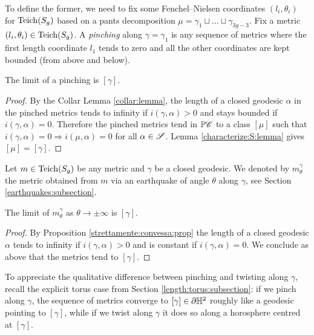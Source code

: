 To define the former, we need to fix some Fenchel--Nielsen coordinates $(l_i, \theta_i)$ for ${\rm Teich}(S_g)$ based on a pants decomposition $\mu = \gamma_1\sqcup \ldots \sqcup \gamma_{3g-3}$.
Fix a metric $(l_i,\theta_i) \in {\rm Teich}(S_g)$. A \emph{pinching} along $\gamma=\gamma_1$ is any sequence of metrics where the first length coordinate $l_1$ tends to zero and all the other coordinates are kept bounded (from above and below).

\begin{prop}
The limit of a pinching is $[\gamma]$.
\end{prop}
\begin{proof}
By the Collar Lemma \ref{collar:lemma}, the length of a closed geodesic $\alpha$ in the pinched metrics tends to infinity if $i(\gamma,\alpha)>0$ and stays bounded if $i(\gamma,\alpha)=0$. Therefore the pinched metrics tend in $\mathbb{P}\mathscr{C}$ to a class $[\mu]$ such that $i(\gamma,\alpha) = 0 \Rightarrow i(\mu,\alpha)=0$ for all $\alpha \in \mathscr{S}$. Lemma 
\ref{characterize:S:lemma} gives $[\mu] = [\gamma]$.
\end{proof}

Let $m\in {\rm Teich}(S_g)$ be any metric and $\gamma$ be a closed geodesic.  We denoted by $m_\theta^\gamma$ the metric obtained from $m$ via an earthquake of angle $\theta$ along $\gamma$, see Section \ref{earthquakes:subsection}.

\begin{prop}
The limit of $m_\theta^\gamma$ as $\theta \to \pm \infty$ is $[\gamma]$.
\end{prop}
\begin{proof}
By Proposition \ref{strettamente:convessa:prop} the length of a closed geodesic $\alpha$ tends to infinity if $i(\gamma,\alpha)>0$ and is constant if $i(\gamma,\alpha)=0$. We conclude as above that the metrics tend to $[\gamma]$.
\end{proof}


To appreciate the qualitative difference between pinching and twisting along $\gamma$, recall the explicit torus case from Section \ref{length:torus:subsection}: if we pinch along $\gamma$, the sequence of metrics converge to $[\gamma]\in \partial \mathbb{H}^2$ roughly like a geodesic pointing to $[\gamma]$, while if we twist along $\gamma$ it does so along a horosphere centred at $[\gamma]$.

